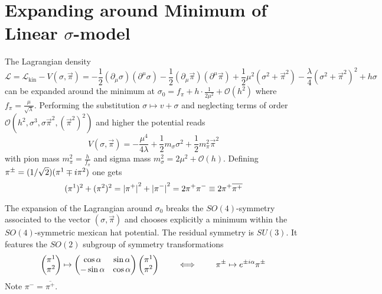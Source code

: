 \section{Expanding around Minimum of Linear $\sigma$-model}

The Lagrangian density
\begin{equation}
    \mathscr{L}=\mathcal{L}_{\text{kin}}-V(\sigma,\vec{\pi})=-\frac{1}{2}(\partial_\mu\sigma)(\partial^\mu\sigma)-\frac{1}{2}(\partial_\mu\vec{\pi})(\partial^\mu\vec{\pi})+\frac{1}{2}\mu^2(\sigma^2+\vec{\pi}^2)-\frac{\lambda}{4}(\sigma^2+\vec{\pi}^2)^2+h\sigma
    \label{eq:LinearSigmaModelLagrangian}
\end{equation}
can be expanded around the minimum at $\sigma_0=f_\pi+h\cdot\frac{1}{2\mu^2}+\mathcal{O}(h^2)$ where $f_\pi=\frac{\mu}{\sqrt{\lambda}}$. Performing the substitution $\sigma\mapsto v+\sigma$ and neglecting terms of order $\mathcal{O}(h^2,\sigma^3,\sigma\vec{\pi}^2,(\vec{\pi}^2)^2)$ and higher the potential reads
\begin{equation}
    V(\sigma,\vec{\pi})=-\frac{\mu^4}{4\lambda}+\frac{1}{2}m_\sigma\sigma^2+\frac{1}{2}m_\pi^2\vec{\pi}^2
\end{equation}
with pion mass $m_\pi^2=\frac{h}{f_\pi}$ and sigma mass $m_\sigma^2=2\mu^2+\mathcal{O}(h)$. Defining $\pi^\pm=(1/\sqrt{2})(\pi^1\mp{i}\pi^2)$ one gets 
\begin{equation}
    (\pi^1)^2+(\pi^2)^2={\vert\pi^+\vert}^2+{\vert\pi^-\vert}^2=2\pi^+\pi^-\equiv 2\pi^+\overline{\pi^+}
\end{equation}

The expansion of the Lagrangian around $\sigma_0$ breaks the $SO(4)$-symmetry associated to the vector $(\sigma,\vec{\pi})$ and chooses explicitly a minimum within the $SO(4)$-symmetric mexican hat potential. The residual symmetry is $SU(3)$. It features the $SO(2)$ subgroup of symmetry transformations
\begin{equation}
    \begin{pmatrix}
        \pi^1\\\pi^2
    \end{pmatrix}
        \mapsto
        \begin{pmatrix}
            \cos\alpha&\sin\alpha\\-\sin\alpha&\cos\alpha
        \end{pmatrix}
        \begin{pmatrix}
            \pi^1\\\pi^2
        \end{pmatrix}
        \qquad\iff\qquad\pi^\pm\mapsto e^{\pm{i}\alpha}\pi^\pm
\end{equation}
Note $\pi^-=\overline{\pi^+}$.

